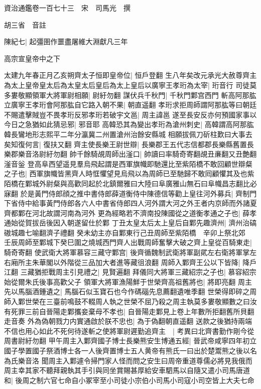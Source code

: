 資治通鑑卷一百七十三　宋　司馬光　撰

胡三省　音註

陳紀七|{
	起彊圉作噩盡屠維大淵獻凡三年}


高宗宣皇帝中之下

太建九年春正月乙亥朔齊太子恒即皇帝位|{
	恒戶登翻}
生八年矣改元承光大赦尊齊主為太上皇帝皇太后為太皇太后皇后為太上皇后以廣寧王孝珩為太宰|{
	珩音行}
司徒莫多婁敬顯領軍大將軍尉相願|{
	尉紆勿翻}
謀伏兵千秋門|{
	千秋門鄴宫西門}
斬高阿那肱立廣寧王孝珩會阿那肱自它路入朝不果|{
	朝直遥翻}
孝珩求拒周師謂阿那肱等曰朝廷不賜遣擊賊豈不畏孝珩反邪孝珩若破宇文邕|{
	周主諱邕}
遂至長安反亦何預國家事以今日之急猶如此猜忌邪|{
	邪音耶}
高韓恐其為變出孝珩為滄州刺史|{
	高韓謂高阿那肱韓長鸞地形志熙平二年分瀛冀二州置滄州治餘安縣城}
相願拔佩刀斫柱歎曰大事去矣知復何言|{
	復扶又翻}
齊主使長樂王尉世辯|{
	長樂郡王五代志信都郡長樂縣舊置長樂郡樂音洛尉紆勿翻}
帥千餘騎覘周師出滏口|{
	帥讀曰率騎奇寄翻覘丑亷翻又丑艶翻滏音釡}
登高阜西望遥見羣烏飛起謂是西軍旗幟即馳還比至紫陌橋不敢回顧世辯粲之子也|{
	西軍旗幟皆黑齊人時恇懼望見烏飛以為周師已至馳歸不敢囘顧懼其及也紫陌橋在鄴城外尉粲與高歡同起於北鎮爾雅曰大陸曰阜廣雅山無石曰阜幟昌志翻比必寐翻}
於是黃門侍郎顔之推中書侍郎薛道衡侍中陳德信等勸上皇往河外募兵|{
	齊制門下省侍中給事黃門侍郎各六人中書省侍郎四人河外謂大河之外王者内京師而外諸夏齊都鄴在河北故謂河南為河外}
更為經略若不濟南投陳國從之道衡孝通之子也|{
	薛孝通始從賀拔岳後因入朝遂留仕於鄴}
丁丑太皇太后太上皇后自鄴先趣濟州|{
	濟州治碻磝城趣七喻翻濟子禮翻}
癸未幼主亦自鄴東行己丑周師至紫陌橋　辛卯上祭北郊　壬辰周師至鄴城下癸巳圍之燒城西門齊人出戰周師奮擊大破之齊上皇從百騎東走|{
	騎奇寄翻}
使武衛大將軍慕容三藏守鄴宫|{
	後齊循魏制武衛將軍副貮左右衛將軍掌左右廂所主朱華閣以外階從三品加大者進等藏徂浪翻}
周師入鄴齊王公以下皆降|{
	降戶江翻}
三藏猶拒戰周主引見禮之|{
	見賢遍翻}
拜儀同大將軍三藏紹宗之子也|{
	慕容紹宗始從爾朱氏後事高歡父子}
領軍大將軍漁陽鮮于世榮齊高祖舊將也|{
	將即亮翻}
周主先以馬腦酒鍾遺之|{
	馬腦石似玉寶石也今作碼碯先息薦翻遺唯季翻}
世榮得即碎之周師入鄴世榮在三臺前鳴鼓不輟周人執之世榮不屈乃殺之周主執莫多婁敬顯數之曰汝有死罪三前自晉陽走鄴攜妾棄母不孝也|{
	自晉陽走鄴見上卷上年數所拒翻舊所貝翻走音奏}
外為偽朝戮力内實通啟於朕不忠也|{
	為于偽翻朝直遥翻}
送款之後猶持兩端不信也用心如此不死何待遂斬之使將軍尉遲勤追齊主　|{
	考異曰北齊書勤作剛今從周書尉紆勿翻}
甲午周主入鄴齊國子博士長樂熊安生博通五經|{
	晉武帝咸寧四年初立國子學置國子祭酒博士各一人後齊置博士五人黄帝有熊氏一曰出於楚鬻熊之後以名為氏樂音洛}
聞周主入鄴遽令掃門家人怪而問之安生曰周帝重道尊儒必將見我俄而周主幸其家不聽拜親執其手引與同坐賞賜甚厚給安車駟馬以自隨又遣小司馬唐道和|{
	後周之制六官七命自小冢宰至小司徒小宗伯小司馬小司寇小司空皆上大夫七命}
